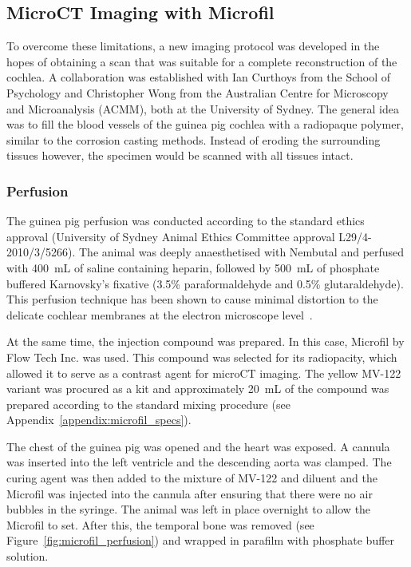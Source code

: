 \subsection{MicroCT Imaging with Microfil}

To overcome these limitations, a new imaging protocol was developed in the hopes
of obtaining a scan that was suitable for a complete reconstruction of the
cochlea. A collaboration was established with Ian Curthoys from the School of
Psychology and Christopher Wong from the Australian Centre for Microscopy and
Microanalysis (ACMM), both at the University of Sydney. The general idea was to
fill the blood vessels of the guinea pig cochlea with a radiopaque polymer,
similar to the corrosion casting methods. Instead of eroding the surrounding
tissues however, the specimen would be scanned with all tissues intact.

\subsubsection{Perfusion}

The guinea pig perfusion was conducted according to the standard ethics approval
(University of Sydney Animal Ethics Committee approval L29/4-2010/3/5266). The
animal was deeply anaesthetised with Nembutal and perfused with 400~mL of saline
containing heparin, followed by 500~mL of phosphate buffered Karnovsky's
fixative (3.5\% paraformaldehyde and 0.5\% glutaraldehyde). This perfusion
technique has been shown to cause minimal distortion to the delicate cochlear
membranes at the electron microscope level~\cite{anniko1977}.

At the same time, the injection compound was prepared. In this case, Microfil by
Flow Tech Inc. was used. This compound was selected for its radiopacity, which
allowed it to serve as a contrast agent for microCT imaging. The yellow MV-122
variant was procured as a kit and approximately 20~mL of the compound was
prepared according to the standard mixing procedure (see
Appendix~\ref{appendix:microfil_specs}).

The chest of the guinea pig was opened and the heart was exposed. A cannula was
inserted into the left ventricle and the descending aorta was clamped. The
curing agent was then added to the mixture of MV-122 and diluent and the
Microfil was injected into the cannula after ensuring that there were no air
bubbles in the syringe. The animal was left in place overnight to allow the
Microfil to set. After this, the temporal bone was removed (see
Figure~\ref{fig:microfil_perfusion}) and wrapped in parafilm with phosphate
buffer solution.

